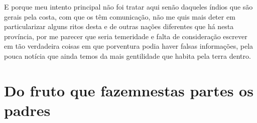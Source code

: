 E porque meu intento principal não foi tratar aqui senão daqueles índios
que são gerais pela costa, com que os  têm comunicação, não
me quis mais deter em particularizar alguns ritos desta e de outras
nações diferentes que há nesta província, por me parecer que seria
temeridade e falta de consideração escrever em  tão verdadeira
coisas em que porventura podia haver falsas informações, pela pouca \EP[1]
notícia que ainda temos da mais gentilidade que habita pela terra dentro.		%



\chapter[Do fruto que fazem nestas partes os padres]{Do fruto que
fazem\break nestas partes os padres} 




